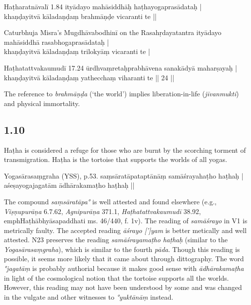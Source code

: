 \begin{ekdosis}
\begin{testimonia}[hp01_009]
Haṭharatnāvalī 1.84
\startverse
ityādayo mahāsiddhāḥ haṭhayogaprasādataḥ |\\
khaṇḍayitvā kāladaṇḍaṃ brahmāṇḍe vicaranti te ||
\endverse

Caturbhuja Misra's Mugdhāvabodhinī on the Rasahṛdayatantra
\startverse
ityādayo mahāsiddhā rasabhogaprasādataḥ |\\
khaṇḍayitvā kāladaṇḍaṃ trilokyāṃ vicaranti te |
\endverse

Haṭhatattvakaumudī 17.24
\startverse
ūrdhvaṃretaḥprabhāvena sanakādyā maharṣayaḥ |\\
khaṇḍayitvā kāladaṇḍaṃ yathecchaṃ viharanti te || 24 ||
\endverse
\end{testimonia}

\begin{philcomm}[hp01_009]        
The reference to \emph{brahmāṇḍa} (‘the world’) implies liberation-in-life (\emph{jīvanmukti}) and physical immortality.  
\end{philcomm}

\subsection*{1.10}
\begin{translation}[hp01_010]
Haṭha is considered a refuge for those who are burnt by the scorching torment of transmigration. Haṭha is the tortoise that supports the worlds of all yogas.
\end{translation}

\begin{testimonia}[hp01_010]
Yogasārasaṃgraha (YSS), p.53.
\startverse
saṃsāratāpataptānāṃ samāśrayahaṭho haṭhaḥ |\\
aśeṣayogajagatām ādhārakamaṭho haṭhaḥ ||
\endverse
\end{testimonia}

\begin{philcomm}[hp01_010] 
The compound \emph{saṃsāratāpa°} is well attested and found elsewhere (e.g., \emph{Viṣṇupurāṇa} 6.7.62, \emph{Agnipurāṇa} 371.1, \emph{Haṭhatattvakaumudī} 38.92, emph{Haṭhābhyāsapaddhati} ms. 46/440, f. 1v). The reading of \emph{samāśrayo} in V1 is metrically faulty. The accepted reading \emph{āśrayo [']yam} is better metically and well attested. N23 preserves the reading \emph{samāśrayamaṭho haṭhaḥ} (similar to the \emph{Yogasārasaṃgraha}), which is similar to the fourth \emph{pāda}. Though this reading is possible, it seems more likely that it came about through dittography. The word \emph{°jagatāṃ} is probably authorial because it makes good sense with  \emph{ādhārakamaṭha} in light of the cosmological notion that the tortoise supports all the worlds. However, this reading may not have been understood by some and was changed in the vulgate and other witnesses to \emph{°yuktānāṃ} instead.      
\end{philcomm}


\end{ekdosis}

